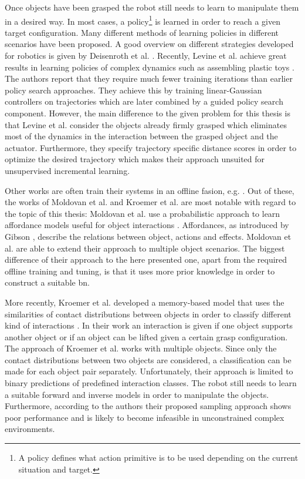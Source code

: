 Once objects have been grasped the robot still needs to learn to manipulate them in a desired way. In most cases, a policy\footnote{A policy defines what action primitive is to be used depending on the current situation and target.} is learned in order to reach a given target configuration. Many different methods of learning policies in different scenarios have been proposed. A good overview on different strategies developed for robotics is given by Deisenroth et al. \cite{deisenroth2013survey}. Recently, Levine et al. achieve great results in learning policies of complex dynamics such as assembling plastic toys \cite{levine2015learning}. The authors report that they require much fewer training iterations than earlier policy search approaches. They achieve this by training linear-Gaussian controllers on trajectories which are later combined by a guided policy search component.
However, the main difference to the given problem for this thesis is that Levine et al. consider the objects already firmly grasped which eliminates most of the dynamics in the interaction between the grasped object and the actuator. Furthermore, they specify trajectory specific distance scores in order to optimize the desired trajectory which makes their approach unsuited for unsupervised incremental learning.

Other works are often train their systems in an offline fasion, e.g. 
\cite{nishide2008predicting, moldovan2012learning, contactPrediction}. Out of these, the works of Moldovan et al. and Kroemer et al. are most notable with regard to the topic of this thesis:
Moldovan et al. use a probabilistic approach to learn affordance models useful for object interactions \cite{moldovan2012learning}. Affordances, as introduced by Gibson \cite{affordances}, describe the relations between object, actions and effects. Moldovan et al. are able to extend their approach to multiple object scenarios. The biggest difference of their approach to the here presented one, apart from the required offline training and tuning, is that it uses more prior knowledge in order to construct a suitable \gls{bn}.

More recently, Kroemer et al. developed a memory-based model that uses the similarities of contact distributions between objects in order to classify different kind of interactions \cite{contactPrediction}. In their work an interaction is given if one object supports another object or if an object can be lifted given a certain grasp configuration. The approach of Kroemer et al. works with multiple objects. Since only the contact distributions between two objects are considered, a classification can be made for each object pair separately. Unfortunately, their approach is limited to binary predictions of predefined interaction classes. The robot still needs to learn a suitable forward and inverse models in order to manipulate the objects. Furthermore, according to the authors their proposed sampling approach shows poor performance and is likely to become infeasible in unconstrained complex environments.

